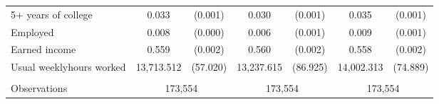 \begin{tabular}{lcccccc}
 \hspace{0.3cm} 5$+$ years of college  & 0.033 & (0.001)  & 0.030 & (0.001)  & 0.035 & (0.001)  \\
 Employed  & 0.008 & (0.000)  & 0.006 & (0.001)  & 0.009 & (0.001)  \\
 Earned income  & 0.559 & (0.002)  & 0.560 & (0.002)  & 0.558 & (0.002)  \\
 Usual weeklyhours worked  & 13,713.512 & (57.020)  & 13,237.615 & (86.925)  & 14,002.313 & (74.889)  \\
\\
Observations & \multicolumn{2}{c}{173,554} & \multicolumn{2}{c}{173,554} & \multicolumn{2}{c}{173,554} \\
\bottomrule
\bottomrule
\end{tabular}